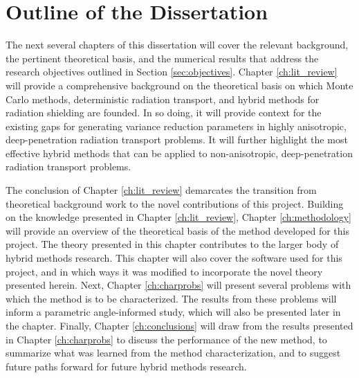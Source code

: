 \section{Outline of the Dissertation}
\label{sec:outline}

The next several chapters of this dissertation will cover the relevant
background, the pertinent theoretical basis, and the numerical results that
address the research objectives outlined in Section \ref{sec:objectives}.
Chapter \ref{ch:lit_review} will provide a
comprehensive background on the theoretical basis on which Monte Carlo methods,
deterministic radiation transport, and hybrid methods for radiation shielding
are founded. In so doing, it will provide context for the existing gaps for
generating variance reduction parameters in
highly anisotropic, deep-penetration radiation transport problems. It will
further
highlight the most effective hybrid methods that can be applied to
non-anisotropic, deep-penetration radiation transport problems.

The conclusion of Chapter \ref{ch:lit_review} demarcates the transition from
theoretical background work to the novel contributions of this project.
Building on
the knowledge presented in Chapter \ref{ch:lit_review},
Chapter \ref{ch:methodology} will provide an overview of the
theoretical basis of the method developed for this project. The theory
presented in this chapter contributes to the larger body of hybrid
methods research. This chapter will also cover the software used for this
project, and in which ways it was modified to incorporate the novel theory
presented herein. Next, Chapter \ref{ch:charprobs} will present several problems
with which the method is to be characterized. The results from these problems
will inform a parametric angle-informed study, which will also be presented
later in the chapter. Finally, Chapter \ref{ch:conclusions} will draw from the
results presented in Chapter \ref{ch:charprobs} to discuss the performance of
the new method, to summarize what was learned from the method characterization,
and to suggest future paths forward for future hybrid methods research.



